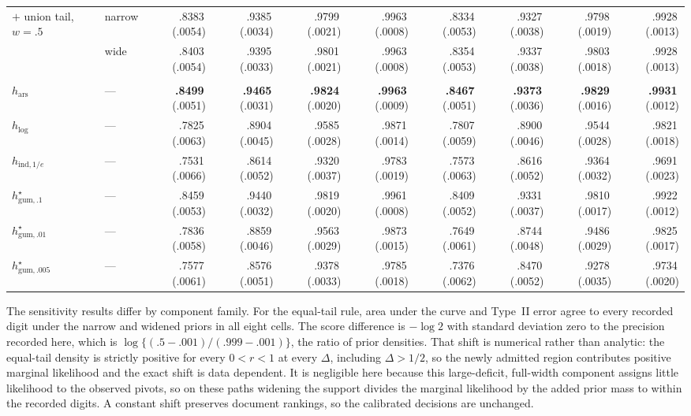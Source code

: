 \documentclass[11pt]{article}
\newcommand{\mcse}[2]{\mbox{#1\,{\fontsize{7}{8}\selectfont(#2)}}}
\newcommand{\bestmcse}[2]{\mbox{\textbf{#1}\,{\fontsize{7}{8}\selectfont(#2)}}}
\begin{document}
\begin{table}[t]
\begin{tabular}{@{}llrrrrrrrr@{}}
\addlinespace
\quad $+$ union tail, $w=.5$ & narrow & \mcse{.8383}{.0054} & \mcse{.9385}{.0034} & \mcse{.9799}{.0021} & \mcse{.9963}{.0008} & \mcse{.8334}{.0053} & \mcse{.9327}{.0038} & \mcse{.9798}{.0019} & \mcse{.9928}{.0013} \\
 & wide & \mcse{.8403}{.0054} & \mcse{.9395}{.0033} & \mcse{.9801}{.0021} & \mcse{.9963}{.0008} & \mcse{.8354}{.0053} & \mcse{.9337}{.0038} & \mcse{.9803}{.0018} & \mcse{.9928}{.0013} \\
\addlinespace
\multicolumn{10}{@{}l}{\textit{Reference scores}}\\
$h_{\mathrm{ars}}$ & --- & \bestmcse{.8499}{.0051} & \bestmcse{.9465}{.0031} & \bestmcse{.9824}{.0020} & \bestmcse{.9963}{.0009} & \bestmcse{.8467}{.0051} & \bestmcse{.9373}{.0036} & \bestmcse{.9829}{.0016} & \bestmcse{.9931}{.0012} \\
$h_{\log}$ & --- & \mcse{.7825}{.0063} & \mcse{.8904}{.0045} & \mcse{.9585}{.0028} & \mcse{.9871}{.0014} & \mcse{.7807}{.0059} & \mcse{.8900}{.0046} & \mcse{.9544}{.0028} & \mcse{.9821}{.0018} \\
$h_{\mathrm{ind},1/e}$ & --- & \mcse{.7531}{.0066} & \mcse{.8614}{.0052} & \mcse{.9320}{.0037} & \mcse{.9783}{.0019} & \mcse{.7573}{.0063} & \mcse{.8616}{.0052} & \mcse{.9364}{.0032} & \mcse{.9691}{.0023} \\
$h^\star_{\mathrm{gum},.1}$ & --- & \mcse{.8459}{.0053} & \mcse{.9440}{.0032} & \mcse{.9819}{.0020} & \mcse{.9961}{.0008} & \mcse{.8409}{.0052} & \mcse{.9331}{.0037} & \mcse{.9810}{.0017} & \mcse{.9922}{.0012} \\
$h^\star_{\mathrm{gum},.01}$ & --- & \mcse{.7836}{.0058} & \mcse{.8859}{.0046} & \mcse{.9563}{.0029} & \mcse{.9873}{.0015} & \mcse{.7649}{.0061} & \mcse{.8744}{.0048} & \mcse{.9486}{.0029} & \mcse{.9825}{.0017} \\
$h^\star_{\mathrm{gum},.005}$ & --- & \mcse{.7577}{.0061} & \mcse{.8576}{.0051} & \mcse{.9378}{.0033} & \mcse{.9785}{.0018} & \mcse{.7376}{.0062} & \mcse{.8470}{.0052} & \mcse{.9278}{.0035} & \mcse{.9734}{.0020} \\
\bottomrule
\end{tabular}
\end{table}

The sensitivity results differ by component family.  For the equal-tail rule, area
under the curve and Type~II error agree to every recorded digit under the narrow
and widened priors in all eight cells.  The score difference is $-\log2$ with standard
deviation zero to the precision recorded here, which is
$\log\{(.5-.001)/(.999-.001)\}$, the ratio of prior densities.  That shift is
numerical rather than analytic: the equal-tail density is strictly positive for
every $0<r<1$ at every $\Delta$, including $\Delta>1/2$, so the newly admitted
region contributes positive marginal likelihood and the exact shift is data dependent.  It is
negligible here because this large-deficit, full-width component assigns little
likelihood to the observed pivots, so on these paths widening the support divides the marginal
likelihood by the added prior mass to within the recorded digits.  A
constant shift preserves document rankings, so the calibrated decisions are unchanged.
\end{document}
